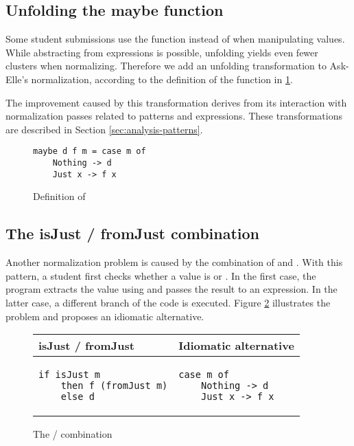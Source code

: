 \subsection{Unfolding the maybe function}

Some student submissions use the  function instead of  when manipulating  values. While abstracting  from  expressions is possible, unfolding  yields even fewer clusters when normalizing. Therefore we add an unfolding transformation to Ask-Elle's normalization, according to the definition of the function in \ref{fig:maybe-definition}.

The improvement caused by this transformation derives from its interaction with normalization passes related to patterns and  expressions. These transformations are described in Section \ref{sec:analysis-patterns}.


\begin{figure}
\centering
\begin{verbatim}
maybe d f m = case m of
    Nothing -> d
    Just x -> f x
\end{verbatim}
\caption{Definition of }
\label{fig:maybe-definition}
\end{figure}

\subsection{The isJust / fromJust combination}

Another normalization problem is caused by the combination of  and . With this pattern, a student first checks whether a value is  or . In the first case, the program extracts the value using  and passes the result to an expression. In the latter case, a different branch of the code is executed. Figure \ref{fig:maybe-isjust-fromjust} illustrates the problem and proposes an idiomatic alternative.

\begin{figure}
\centering
\begin{tabular}{ >{\centering\arraybackslash}m{13em} | >{\centering\arraybackslash}m{13em} }
isJust / fromJust & Idiomatic alternative \\
\hline
\begin{verbatim}
if isJust m
    then f (fromJust m)
    else d
\end{verbatim}
& \begin{verbatim}
case m of
    Nothing -> d
    Just x -> f x
\end{verbatim}
\end{tabular}
\caption{The  /  combination}
\label{fig:maybe-isjust-fromjust}
\end{figure}

